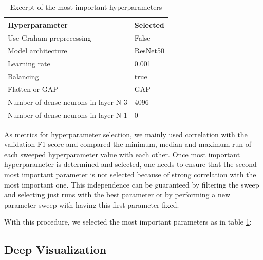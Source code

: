 \documentclass{article}
\begin{document}
\renewcommand{\arraystretch}{1.2}
\begin{table}
  \begin{tabular}{|l|l|}
  \hline
  Hyperparameter & Selected\\ \hline \hline
  Use Graham preprecessing & False \\ \hline
  Model architecture & ResNet50 \\ \hline
  Learning rate & 0.001 \\ \hline
  Balancing & true \\ \hline
  Flatten or GAP & GAP \\ \hline
  Number of dense neurons in layer N-3 & 4096 \\ \hline
  Number of dense neurons in layer N-1 & 0 \\ \hline
  \end{tabular}
  \caption{Excerpt of the most important hyperparameters} \label{tab:hyperparam}
  \end{table}


As metrics for hyperparameter selection, we mainly used correlation with the validation-F1-score and 
compared the minimum, median and maximum run of each sweeped hyperparameter value with each other. 
Once most important hyperparameter is determined and selected, one needs to ensure that the second most important
parameter is not selected because of strong correlation with the most important one. This independence can be 
guaranteed by filtering the sweep and selecting just runs with the best parameter or by performing a new parameter sweep
with having this first parameter fixed.

With this procedure, we selected the most important parameters as in table \ref{tab:hyperparam}:





\subsection{Deep Visualization}
\end{document}
